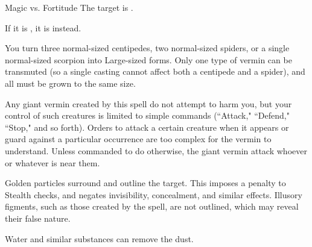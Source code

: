 \begin{spellheader}
    \spellrng{\rngmed}
\end{spellheader}
\begin{spelleffects}
    \begin{spellattack}{Magic vs. Fortitude}
        \spellsuccess The target is \sickened.

        If it is \bloodied, it is \nauseated instead.
    \end{spellattack}
\end{spelleffects}
\begin{spellfooter}

\end{spellfooter}

\begin{spellheader}
    \spelldur{\durmed}
\end{spellheader}
\begin{spelleffects}
    \spelleffect You turn three normal-sized centipedes, two normal-sized spiders, or a single normal-sized scorpion into Large-sized forms. Only one type of vermin can be transmuted (so a single casting cannot affect both a centipede and a spider), and all must be grown to the same size.
    \par Any giant vermin created by this spell do not attempt to harm you, but your control of such creatures is limited to simple commands (``Attack," ``Defend," ``Stop," and so forth). Orders to attack a certain creature when it appears or guard against a particular occurrence are too complex for the vermin to understand. Unless commanded to do otherwise, the giant vermin attack whoever or whatever is near them.
\end{spelleffects}
\begin{spellfooter}

\end{spellfooter}

\begin{spellheader}
    \spelldur{\durshort}
\end{spellheader}
\begin{spelleffects}
    \spelleffect Golden particles surround and outline the target. This imposes a  penalty to Stealth checks, and negates invisibility, concealment, and similar effects. Illusory figments, such as those created by the  spell, are not outlined, which may reveal their false nature.
\end{spelleffects}
\begin{spellfooter}
    \spellnotes Water and similar substances can remove the dust.
\end{spellfooter}

